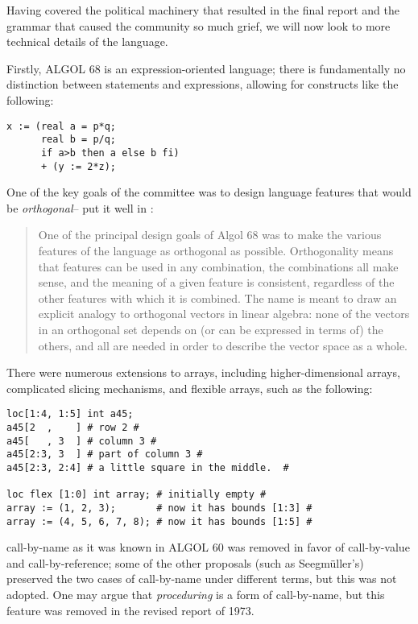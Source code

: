 Having covered the political machinery that resulted in the final report and
the grammar that caused the community so much grief,
we will now look to more technical details of the language.

Firstly, ALGOL 68 is an expression-oriented language;
there is fundamentally no distinction between statements and expressions,
allowing for constructs like the following:

\begin{lstlisting}[language=algol,frame=single]
x := (real a = p*q;
      real b = p/q;
      if a>b then a else b fi)
      + (y := 2*z);
\end{lstlisting}

One of the key goals of the committee was to design language features that
would be \textit{orthogonal}--\citeauthor{programming_language_pragmatics_2009}
put it well in \cite{programming_language_pragmatics_2009}:

\begin{quotation}
	One of the principal design goals of Algol 68 was to make the various features
	of the language as orthogonal as possible. Orthogonality means that features can
	be used in any combination, the combinations all make sense, and the meaning
	of a given feature is consistent, regardless of the other features with which it is
	combined. The name is meant to draw an explicit analogy to orthogonal vectors
	in linear algebra: none of the vectors in an orthogonal set depends on (or can
	be expressed in terms of) the others, and all are needed in order to describe the
	vector space as a whole.
\end{quotation}

There were numerous extensions to arrays, including higher-dimensional arrays,
complicated slicing mechanisms, and flexible arrays, such as the following:
\begin{lstlisting}[language=algol,frame=single]
loc[1:4, 1:5] int a45;
a45[2  ,    ] # row 2 #
a45[   , 3  ] # column 3 #
a45[2:3, 3  ] # part of column 3 #
a45[2:3, 2:4] # a little square in the middle.  #

loc flex [1:0] int array; # initially empty #
array := (1, 2, 3);       # now it has bounds [1:3] #
array := (4, 5, 6, 7, 8); # now it has bounds [1:5] #
\end{lstlisting}

\Gls{call-by-name} as it was known in ALGOL 60 was removed in favor of
\gls{call-by-value} and \gls{call-by-reference}; some of the other proposals
(such as Seegm{\"u}ller's) preserved the two cases of call-by-name
under different terms, but this was not adopted.
One may argue that \textit{proceduring} is a form of call-by-name,
but this feature was removed in the revised report of 1973.

